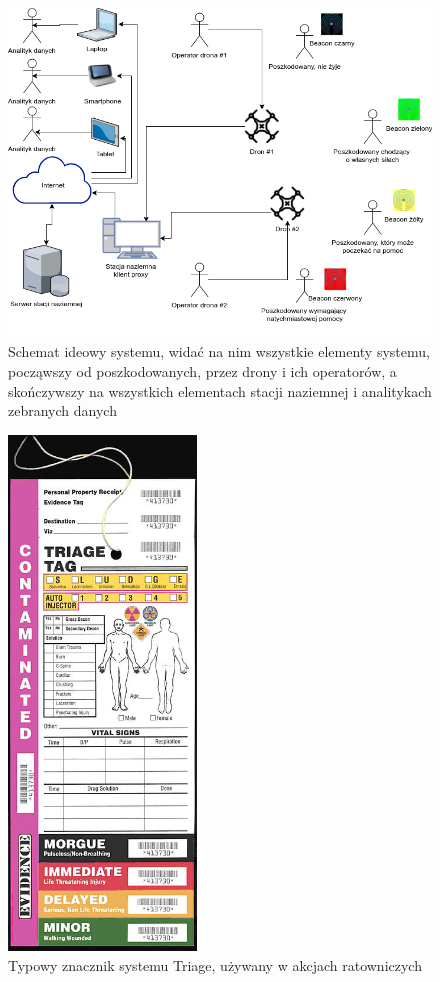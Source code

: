 \begin{figure}[!th]
    \centering
    \includegraphics[width=15cm]{zalaczniki/obrazy/schemat_ideowy.png}
    \caption{Schemat ideowy systemu, widać na nim wszystkie elementy systemu, począwszy od poszkodowanych, przez drony i ich operatorów, a skończywszy na wszystkich elementach stacji naziemnej i analitykach zebranych danych}
    \label{fig:schematIdeowy}
\end{figure}

\begin{figure}[!th]
    \centering
    \includegraphics[width=5cm]{zalaczniki/obrazy/triage_tag.jpg}
    \caption{Typowy znacznik systemu Triage, używany w akcjach ratowniczych \cite{triage}}
    \label{fig:triage}
\end{figure}

